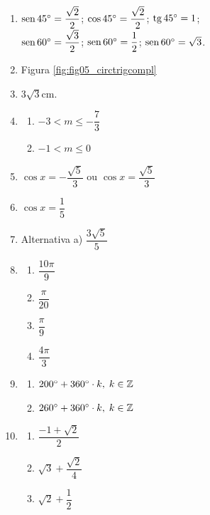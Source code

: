  \begin{enumerate}
    \item $\operatorname{sen} 45 \degree = \dfrac{\sqrt{2}}{2}$; 
     $\cos 45 \degree = \dfrac{\sqrt{2}}{2}$; 
     $\operatorname{tg} 45 \degree = 1$; \\ [0.25cm]
     $\operatorname{sen} 60 \degree = \dfrac{\sqrt{3}}{2}$; 
     $\operatorname{sen} 60 \degree = \dfrac{1}{2}$; 
     $\operatorname{sen} 60 \degree = \sqrt{3}$.     
    \item   Figura \ref{fig:fig05_circtrigcompl} {\color{green!65!black}}
    \item   $3\sqrt{3}$cm.
    \item   
        \begin{enumerate}
            \item $-3 < m \le -\dfrac{7}{3}$
            \item $-1 < m \le 0$
        \end{enumerate}
    \item   $\cos x = -\dfrac{\sqrt{5}}{3}$ ou $\cos x = \dfrac{\sqrt{5}}{3}$
    \item   $\cos x = \dfrac{1}{5}$
    \item Alternativa a) $\dfrac{3 \sqrt{5}}{5}$
    \item   
        \begin{enumerate}
            \item $\dfrac{10 \pi}{9}$
            \item $\dfrac{\pi}{20}$
            \item $\dfrac{\pi}{9}$
            \item $\dfrac{4 \pi}{3}$
        \end{enumerate}
    \item
        \begin{enumerate}
            \item $200 \degree + 360 \degree \cdot k, \; k \in \mathbb{Z}$
            \item $260 \degree + 360 \degree \cdot k, \; k \in \mathbb{Z}$
        \end{enumerate}
    \item   
        \begin{enumerate}
            \item $\dfrac{-1 + \sqrt{2}}{2}$
            \item $\sqrt{3} + \dfrac{\sqrt{2}}{4}$
            \item $\sqrt{2} + \dfrac{1}{2}$
        \end{enumerate}
 \end{enumerate}


 